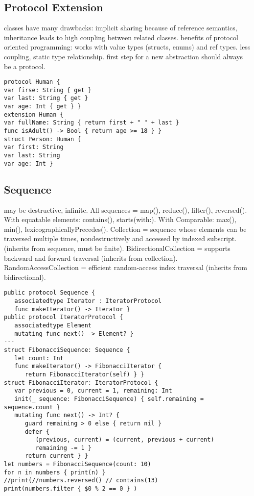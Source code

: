 \subsection{Protocol Extension}
classes have many drawbacks: implicit sharing because of reference semantics, inheritance leads to high coupling between related classes. benefits of protocol oriented programming: works with value types (structs, enums) and ref types. less coupling, static type relationship. first step for a new abstraction should always be a protocol.
\begin{lstlisting}
protocol Human {
var firse: String { get }
var last: String { get }
var age: Int { get } }
extension Human {
var fullName: String { return first + " " + last }
func isAdult() -> Bool { return age >= 18 } }
struct Person: Human {
var first: String
var last: String
var age: Int }
\end{lstlisting}

\subsection{Sequence}
may be destructive, infinite. All sequences = map(), reduce(), filter(), reversed(). With equatable elements: contains(), starts(with:). With Comparable: max(), min(), lexicographicallyPrecedes(). Collection = sequence whose elements can be traversed multiple times, nondestructively and accessed by indexed subscript. (inherits from sequence, must be finite). BidirectionalCollection = supports backward and forward traversal (inherits from collection). RandomAccessCollection = efficient random-access index traversal (inherits from bidirectional).
\begin{lstlisting}
public protocol Sequence {
   associatedtype Iterator : IteratorProtocol
   func makeIterator() -> Iterator }
public protocol IteratorProtocol {
   associatedtype Element
   mutating func next() -> Element? }
---
struct FibonacciSequence: Sequence {
   let count: Int
   func makeIterator() -> FibonacciIterator {
      return FibonacciIterator(self) } }
struct FibonacciIterator: IteratorProtocol {
   var previous = 0, current = 1, remaining: Int
   init(_ sequence: FibonacciSequence) { self.remaining = sequence.count }
   mutating func next() -> Int? {
      guard remaining > 0 else { return nil }
      defer {
         (previous, current) = (current, previous + current)
         remaining -= 1 }
      return current } }
let numbers = FibonacciSequence(count: 10)
for n in numbers { print(n) }
//print(//numbers.reversed() // contains(13)
print(numbers.filter { $0 % 2 == 0 } )
\end{lstlisting}

